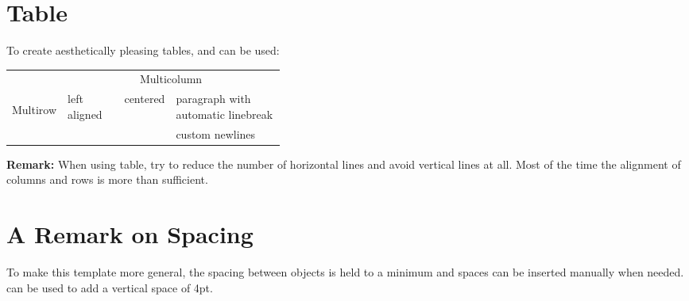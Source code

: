 \documentclass[\fontheight]{extarticle}
\begin{document}
\begin{multicols*}{3}
    \section{Table}
    To create aesthetically pleasing tables,  and  can be used:
    \newpar{}
    \renewcommand{\arraystretch}{1.3}
    \setlength\tabcolsep{6pt} %
    \begin{tabularx}{\linewidth}{@{}llcp{0.4\linewidth}@{}}
        \toprule
                                                                & \multicolumn{3}{c}{Multicolumn}                                                                                        \\
        \cmidrule{2-4}
        \multirow{2}{*}{\begin{sideways}Multirow\end{sideways}} & left aligned                    & centered & paragraph with automatic linebreak    \\
        \cmidrule{2-4}
        \morecmidrules\cmidrule{2-4}
        &                                 &          & custom new\newline lines                                                                         \\
        \bottomrule
    \end{tabularx}
    \renewcommand{\arraystretch}{1}
    \setlength\tabcolsep{6pt} %
    \textbf{Remark:} When using table, try to reduce the number of horizontal lines and avoid vertical lines at all.
    Most of the time the alignment of columns and rows is more than sufficient.

    \section{A Remark on Spacing}
    To make this template more general, the spacing between objects is held to a minimum and spaces can be inserted manually when needed.
     can be used to add a vertical space of 4pt.


\end{multicols*}
\end{document}
